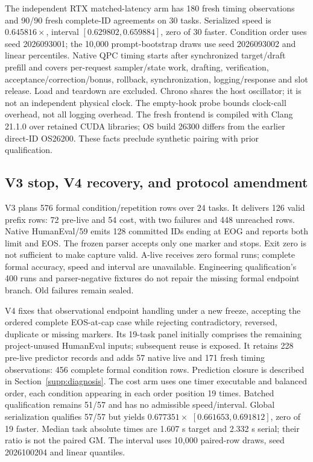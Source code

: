 The independent RTX matched-latency arm has 180 fresh timing observations and 90/90 fresh complete-ID agreements on 30 tasks. Serialized speed is $0.645816\times$, interval $[0.629802,0.659884]$, zero of 30 faster. Condition order uses seed 2026093001; the 10,000 prompt-bootstrap draws use seed 2026093002 and linear percentiles. Native QPC timing starts after synchronized target/draft prefill and covers per-request sampler/state work, drafting, verification, acceptance/correction/bonus, rollback, synchronization, logging/response and slot release. Load and teardown are excluded. Chrono shares the host oscillator; it is not an independent physical clock. The empty-hook probe bounds clock-call overhead, not all logging overhead. The fresh frontend is compiled with Clang 21.1.0 over retained CUDA libraries; OS build 26300 differs from the earlier direct-ID OS26200. These facts preclude synthetic pairing with prior qualification.

\subsection{V3 stop, V4 recovery, and protocol amendment}
\label{supp:v3_v4}
V3 plans 576 formal condition/repetition rows over 24 tasks. It delivers 126 valid prefix rows: 72 pre-live and 54 cost, with two failures and 448 unreached rows. Native HumanEval/59 emits 128 committed IDs ending at EOG and reports both limit and EOS. The frozen parser accepts only one marker and stops. Exit zero is not sufficient to make capture valid. A-live receives zero formal runs; complete formal accuracy, speed and interval are unavailable. Engineering qualification's 400 runs and parser-negative fixtures do not repair the missing formal endpoint branch. Old failures remain sealed.

V4 fixes that observational endpoint handling under a new freeze, accepting the ordered complete EOS-at-cap case while rejecting contradictory, reversed, duplicate or missing markers. Its 19-task panel initially comprises the remaining project-unused HumanEval inputs; subsequent reuse is exposed. It retains 228 pre-live predictor records and adds 57 native live and 171 fresh timing observations: 456 complete formal condition rows. Prediction closure is described in Section~\ref{supp:diagnosis}. The cost arm uses one timer executable and balanced order, each condition appearing in each order position 19 times. Batched qualification remains 51/57 and has no admissible speed/interval. Global serialization qualifies 57/57 but yields $0.677351\times$ $[0.661653,0.691812]$, zero of 19 faster. Median task absolute times are 1.607 s target and 2.332 s serial; their ratio is not the paired GM. The interval uses 10,000 paired-row draws, seed 2026100204 and linear quantiles.

